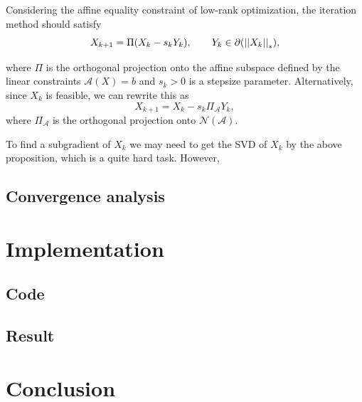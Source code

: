 \documentclass[11pt]{article}
\begin{document}
Considering the affine equality constraint of low-rank optimization, the iteration method should satisfy
\[X_{k+1}= \Pi(X_k-s_k Y_k), \qquad Y_k \in \partial (\left|\left|X_k\right|\right|_*),\]

where \(\Pi\) is the orthogonal projection onto the affine subspace defined by the linear constraints \(\mathcal{A}(X)=b\) and \(s_{k}>0\) is a stepsize parameter. Alternatively, since \(X_{k}\) is feasible, we can rewrite this as
\[
X_{k+1}=X_{k}-s_{k} \Pi_{\mathcal{A}} Y_{k},
\]
where \(\Pi_{\mathcal{A}}\) is the orthogonal projection onto \(\mathcal{N}(\mathcal{A})\). 

To find a subgradient of \(X_k\) we may need to get the SVD of \(X_k\) by the above proposition, which is a quite hard task. However, 
\subsection{Convergence analysis}

\section{Implementation}

\subsection{Code}

\subsection{Result}

\section{Conclusion}




\end{document}
